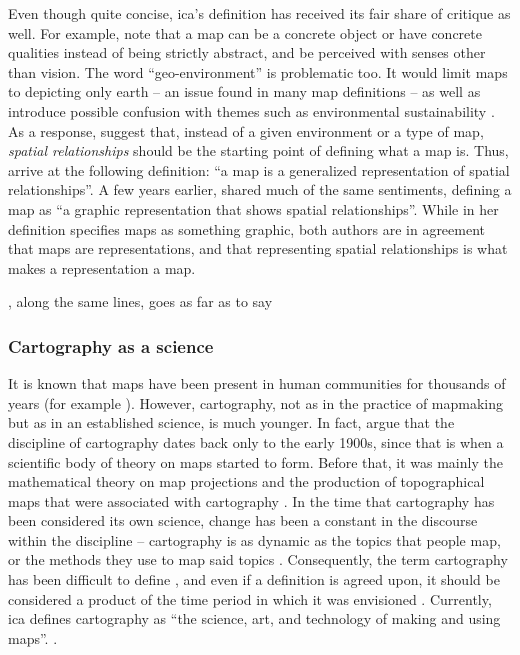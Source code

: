 Even though quite concise,
\acrshort{ica}'s definition has received its fair share of critique as well.
For example, \textcite{lap2021} note that
a map can be a concrete object or have concrete qualities
instead of being strictly abstract,
and be perceived with senses other than vision.
The word \enquote{geo-environment} is problematic too.
It would limit maps to depicting only earth
-- an issue found in many map definitions \parencite{tyn2014} --
as well as introduce possible confusion with themes such as
environmental sustainability \parencite{lap2021}.
As a response, \textcite{lap2021} suggest that,
instead of a given environment or a type of map,
\textit{spatial relationships} should be the starting point of defining what a map is.
Thus, \citeauthor{lap2021} arrive at the following definition:
\enquote{a map is a generalized representation of spatial relationships}.
A few years earlier, \textcite{tyn2014} shared much of the same sentiments,
defining a map as \enquote{a graphic representation that shows spatial relationships}.
While in her definition \citeauthor{tyn2014} specifies maps as something graphic,
both authors are in agreement that maps are representations,
and that representing spatial relationships is what makes a representation a map.

\textcite{mac2004}, along the same lines, goes as far as to say

\subsubsection{Cartography as a science}
It is known that
maps have been present in human communities for thousands of years
(for example \textcite{hsu1993, sch2014}).
However, cartography,
not as in the practice of mapmaking but as in an established science,
is much younger.
In fact, \textcite{woo2003, kai2020} argue that
the discipline of cartography dates back only to the early 1900s,
since that is when a scientific body of theory on maps started to form.
Before that, it was mainly the mathematical theory on map projections
and the production of topographical maps
that were associated with cartography \parencite{kai2020}.
In the time that cartography has been considered its own science,
change has been a constant in the discourse within the discipline \parencite{mac2004} --
cartography is as dynamic as the topics that people map,
or the methods they use to map said topics \parencite{tyn1992, tyn2014}.
Consequently,
the term cartography has been difficult to define \parencite{kry1995},
and even if a definition is agreed upon,
it should be considered a product of the time period
in which it was envisioned \parencite{tyn1992, and1996}.
Currently, \acrshort{ica} defines cartography as
\enquote{the science, art, and technology of making and using maps}.
\parencite{ica2019}.

